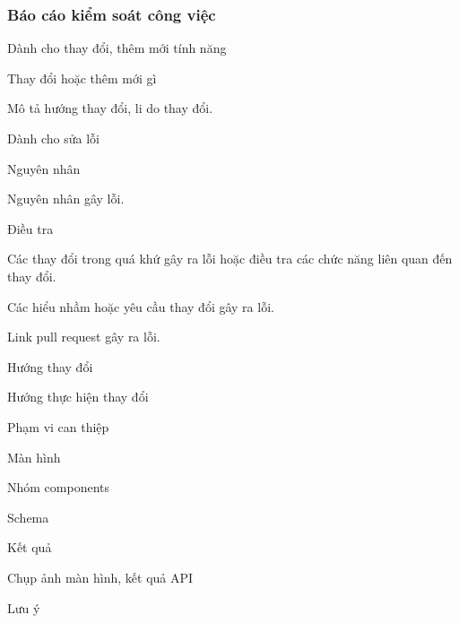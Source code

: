 \subsubsection{Báo cáo kiểm soát công việc}

Dành cho thay đổi, thêm mới tính năng
	
	Thay đổi hoặc thêm mới gì	
	
	Mô tả hướng thay đổi, li do thay đổi.


Dành cho sửa lỗi
	
	
	Nguyên nhân
	
	Nguyên nhân gây lỗi.
	
	Điều tra
	
	Các thay đổi trong quá khứ gây ra lỗi hoặc điều tra các chức năng liên quan đến thay đổi.
	
	Các hiểu nhầm hoặc yêu cầu thay đổi gây ra lỗi.
	
	Link pull request gây ra lỗi.
	
	Hướng thay đổi
	
	Hướng thực hiện thay đổi
	
	Phạm vi can thiệp
	
	Màn hình
	
	Nhóm components
	
	Schema
	
	Kết quả
	
	Chụp ảnh màn hình, kết quả API
	
	Lưu ý

